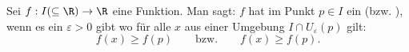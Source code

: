 Sei $f: I (\subseteq \R) \to \R$ eine Funktion. Man sagt: $f$ hat im Punkt $p \in I$ ein  (bzw. ), wenn es ein $\varepsilon > 0$ gibt wo für alle $x$ aus einer Umgebung $I \cap U_\varepsilon(p)$ gilt:
$$f(x) \geq f(p) \qquad \text{bzw.} \qquad f(x) \geq f(p).$$